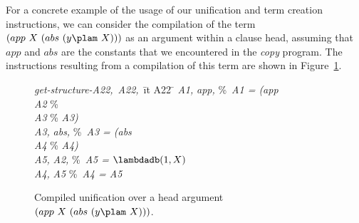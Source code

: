 For a concrete example of the usage of our unification and term creation
instructions, we can consider the compilation of the term
$(app\ X\ (abs\ (y\plam \ X)))$ as an argument within a clause head,
assuming that $app$ and $abs$ are the constants that we encountered in
the {\it copy} program.
The instructions resulting from a compilation of this term are shown
in Figure~\ref{fig:unify_exp}.
\begin{figure}
\begin{tabbing}
\dquad\dquad\= {\it get-structure-}\dquad\={\it A22,}\ \={\it A22,}\ \={it A22} \= \kill
{}  \> {\it A1,}\> {\it app,} \> \%\ {\it A1 = (app\ }\= \\
 \> {\it A2}\>          \>        \> \%                   \=         \\
 \> {\it A3}\>          \>        \> \%                   \>         \> {\it A3)} \\
  \> {\it A3,}\> {\it abs,} \> \%\ {\it A3 = (abs\ } \\
 \> {\it A4}\>          \>        \> \%                   \> {\it A4)} \\
     \> {\it A5,}\> {\it A2,}  \> \%\ {\it A5 = $\lambdadb(1, X)$} \\
  \> {\it A4,}\> {\it A5} \>        \> \%\ {\it A4 = A5}
\end{tabbing}
\caption{Compiled unification over a head argument $(app\ X\ (abs\
(y\plam \ X)))$.}\label{fig:unify_exp}
\end{figure}

